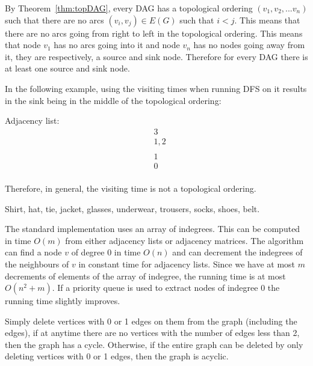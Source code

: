 By Theorem~\ref{thm:topDAG}, every DAG has a topological ordering \((v_1,v_2,...v_n)\) such that 
there are no arcs \((v_i,v_j) \in E(G)\) such that \(i < j\). This means that there are no arcs 
going from right to left in the topological ordering. This means that node \(v_1\) has no 
arcs going into it and node \(v_n\) has no nodes going away from it, they are respectively, 
a source and sink node. Therefore for every DAG there is at least one source and sink node.


In the following example, using the visiting times when running DFS on it results in the sink 
being in the middle of the topological ordering:

Adjacency list:
\begin{align*}
&3 \\
&1,2 \\
& \\
&1 \\
&0 \\
\end{align*}

Therefore, in general, the visiting time is not a topological ordering.
\fi

Shirt, hat, tie, jacket, glasses, underwear, trousers, socks, shoes, belt.


The standard implementation uses an array of indegrees.  This can
be computed in time $O(m)$ from either adjacency lists or adjacency
matrices.  The algorithm can find a node $v$ of degree $0$ in time 
$O(n)$ and can decrement the indegrees of the neighbours of $v$
in constant time for adjacency lists.  Since we have at most $m$ decrements 
of elements of the array of indegree, the running
time is at most $O(n^2+m)$.  If a priority queue is used to 
extract nodes of indegree 0 the running time slightly improves.

Simply delete vertices with 0 or 1 edges on them from the graph (including the edges), 
if at anytime there are no vertices with the number of edges less than 2, then the graph 
has a cycle. Otherwise, if the entire graph can be deleted by only deleting vertices with 
0 or 1 edges, then the graph is acyclic.




